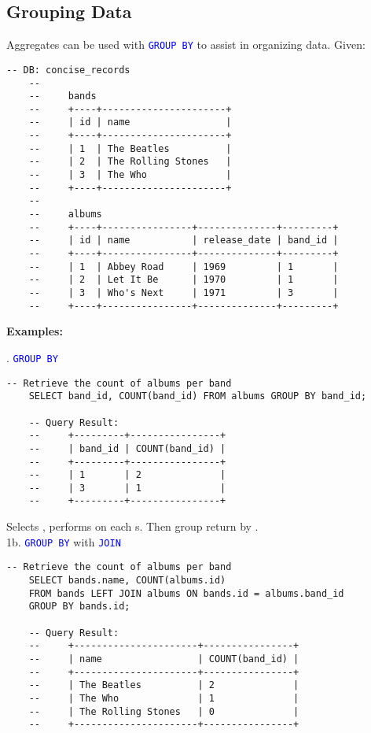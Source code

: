 \subsection{Grouping Data}

\noindent
Aggregates can be used with \textcolor{blue}{\texttt{GROUP BY}} to assist in organizing data. Given:
\begin{lstlisting}[style=sql]
    -- DB: concise_records
    --
    --     bands
    --     +----+----------------------+
    --     | id | name                 |
    --     +----+----------------------+
    --     | 1  | The Beatles          |
    --     | 2  | The Rolling Stones   |
    --     | 3  | The Who              |
    --     +----+----------------------+
    --    
    --     albums
    --     +----+----------------+--------------+---------+
    --     | id | name           | release_date | band_id |
    --     +----+----------------+--------------+---------+
    --     | 1  | Abbey Road     | 1969         | 1       |
    --     | 2  | Let It Be      | 1970         | 1       |
    --     | 3  | Who's Next     | 1971         | 3       |
    --     +----+----------------+--------------+---------+
\end{lstlisting}

\noindent
\textbf{Examples:}

\vspace{.5em}
. \textcolor{blue}{\texttt{GROUP BY}}
\begin{lstlisting}[style=sql]
    -- Retrieve the count of albums per band
    SELECT band_id, COUNT(band_id) FROM albums GROUP BY band_id;
    
    -- Query Result:
    --     +---------+----------------+
    --     | band_id | COUNT(band_id) |
    --     +---------+----------------+
    --     | 1       | 2              |
    --     | 3       | 1              |
    --     +---------+----------------+
\end{lstlisting}

\noindent
Selects , performs  on each s.
Then group return by .\\

\noindent
1b. \textcolor{blue}{\texttt{GROUP BY}} with \textcolor{blue}{\texttt{JOIN}}
\begin{lstlisting}[style=sql]
    -- Retrieve the count of albums per band
    SELECT bands.name, COUNT(albums.id)
    FROM bands LEFT JOIN albums ON bands.id = albums.band_id
    GROUP BY bands.id;

    -- Query Result:
    --     +----------------------+----------------+
    --     | name                 | COUNT(band_id) |
    --     +----------------------+----------------+
    --     | The Beatles          | 2              |
    --     | The Who              | 1              |
    --     | The Rolling Stones   | 0              |
    --     +----------------------+----------------+
\end{lstlisting}

